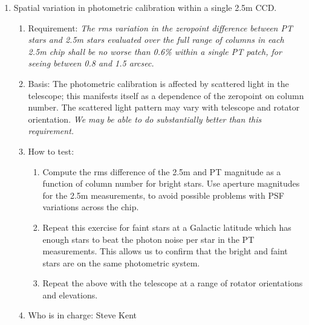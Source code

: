 \begin{enumerate}
\item Spatial variation in photometric calibration within a single 2.5m CCD.
   \begin{enumerate}
   \item Requirement: {\it The rms variation in the zeropoint difference between
	PT stars and 2.5m stars evaluated over the full range of
	columns in each 2.5m chip shall be no worse than 0.6\% within
	a single PT patch, for seeing between 0.8 and 1.5 arcsec.}
   \item Basis:  The photometric calibration is affected by scattered light
	in the telescope; this manifests itself as a dependence of the
	zeropoint on column number.  The scattered light pattern may
	vary with telescope and rotator orientation.  {\it We may
	be able to do substantially better than this requirement.}
   \item How to test:
	\begin{enumerate}
	\item Compute the rms difference of the 2.5m and PT magnitude as a
function of column number for bright stars.  Use aperture magnitudes for the 2.5m
measurements, to avoid possible problems with PSF variations across
the chip.
	\item Repeat this exercise for faint stars at a Galactic
latitude which has enough stars to beat the photon noise per star in
the PT measurements.  
	This allows us to confirm that the bright and faint stars are
	on the same photometric system. 
	\item Repeat the above with the telescope at a range of rotator orientations
		and elevations.
	\end{enumerate}
   \item Who is in charge: Steve Kent
   \end{enumerate}


\end{enumerate}

